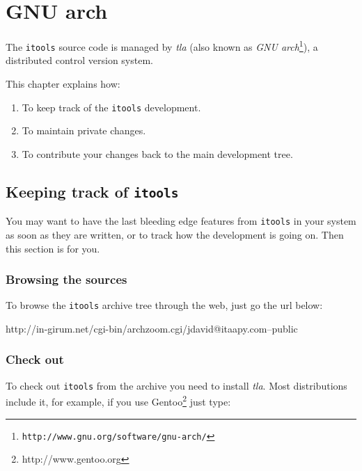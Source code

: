 \chapter{GNU arch}

The {\tt itools} source code is managed by {\em tla} (also known as
{\em GNU arch}\footnote{\tt http://www.gnu.org/software/gnu-arch/}),
a distributed control version system.

This chapter explains how:

\begin{enumerate}
  \item To keep track of the {\tt itools} development.

  \item To maintain private changes.

  \item To contribute your changes back to the main development tree.
\end{enumerate}


\section{Keeping track of {\tt itools}}

You may want to have the last bleeding edge features from {\tt itools} in
your system as soon as they are written, or to track how the development
is going on. Then this section is for you.

\subsection{Browsing the sources}

To browse the {\tt itools} archive tree through the web, just go the url
below:

\begin{code}
    http://in-girum.net/cgi-bin/archzoom.cgi/jdavid@itaapy.com--public
\end{code}

\subsection{Check out}

To check out {\tt itools} from the archive you need to install {\em tla}.
Most distributions include it, for example, if you use
Gentoo\footnote{http://www.gentoo.org} just type:


